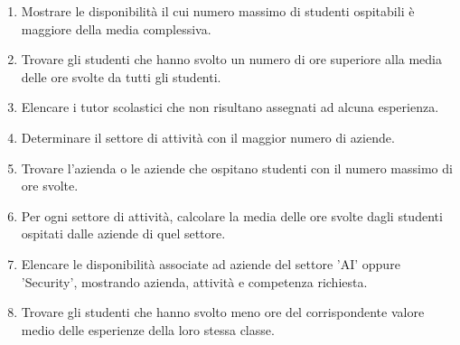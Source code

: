 \documentclass[a4paper,12pt]{article}
\begin{document}
\begin{enumerate}[leftmargin=0.8cm,label=\textbf{\arabic*.}]
\item Mostrare le disponibilità il cui numero massimo di studenti ospitabili è maggiore della media complessiva.
\item Trovare gli studenti che hanno svolto un numero di ore superiore alla media delle ore svolte da tutti gli studenti.
\item Elencare i tutor scolastici che non risultano assegnati ad alcuna esperienza.
\item Determinare il settore di attività con il maggior numero di aziende.
\item Trovare l'azienda o le aziende che ospitano studenti con il numero massimo di ore svolte.
\item Per ogni settore di attività, calcolare la media delle ore svolte dagli studenti ospitati dalle aziende di quel settore.
\item Elencare le disponibilità associate ad aziende del settore 'AI' oppure 'Security', mostrando azienda, attività e competenza richiesta.
\item Trovare gli studenti che hanno svolto meno ore del corrispondente valore medio delle esperienze della loro stessa classe.\end{enumerate}
\end{document}
